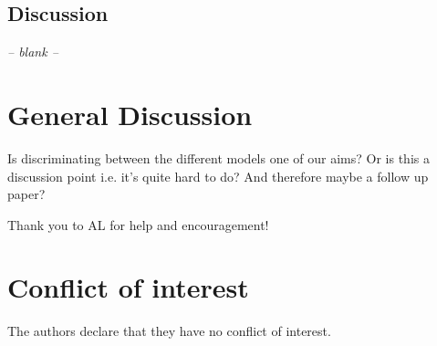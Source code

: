 \documentclass[smallextended]{svjour3}       %
\begin{document}
\subsection{Discussion}
\begin{center}
\textit{-- blank --}
\end{center}

\section{General Discussion}

Is discriminating between the different models one of our aims? Or is this a discussion point i.e. it's quite hard to do? And therefore maybe a follow up paper?


\begin{acknowledgements}
Thank you to AL for help and encouragement! 
\end{acknowledgements}

%
\section*{Conflict of interest}
The authors declare that they have no conflict of interest.

\end{document}
